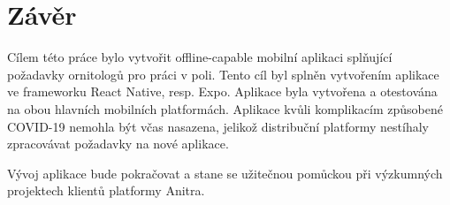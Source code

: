 \chapter*{Závěr}

Cílem této práce bylo vytvořit offline-capable mobilní aplikaci splňující požadavky ornitologů pro práci v poli. Tento cíl byl splněn vytvořením aplikace ve frameworku React Native, resp. Expo. Aplikace byla vytvořena a otestována na obou hlavních mobilních platformách. Aplikace kvůli komplikacím způsobené COVID-19 nemohla být včas nasazena, jelikož distribuční platformy nestíhaly zpracovávat požadavky na nové aplikace.

Vývoj aplikace bude pokračovat a stane se užitečnou pomůckou při výzkumných projektech klientů platformy Anitra.
